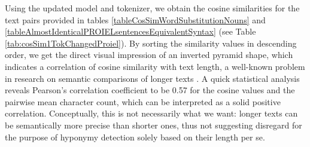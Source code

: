 Using the updated model and tokenizer, we obtain the cosine similarities for the text pairs provided in tables \ref{tableCosSimWordSubstitutionNouns} and \ref{tableAlmostIdenticalPROIELsentencesEquivalentSyntax} (see Table \ref{tab:cosSim1TokChangedProiel}). By sorting the similarity values in descending order, we get the direct visual impression of an inverted pyramid shape, which indicates a correlation of cosine similarity with text length, a well-known problem in research on semantic comparisons of longer texts \parencite[40]{singhalModernInformationRetrieval2001}. A quick statistical analysis reveals Pearson's correlation coefficient to be 0.57 for the cosine values and the pairwise mean character count, which can be interpreted as a solid positive correlation. Conceptually, this is not necessarily what we want: longer texts can be semantically more precise than shorter ones, thus not suggesting disregard for the purpose of hyponymy detection solely based on their length per se.

